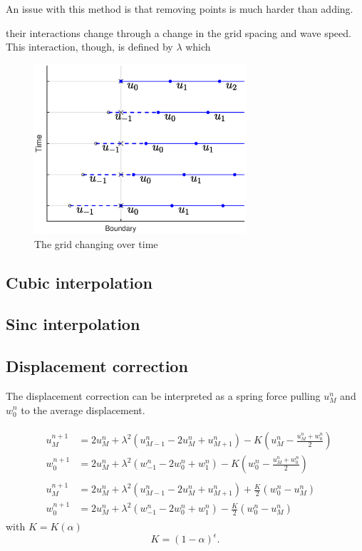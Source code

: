 An issue with this method is that removing points is much harder than adding.

their interactions change through a change in the grid spacing and wave speed. This interaction, though, is defined by $\lambda$ which 

\begin{figure}
    \centering
\includegraphics[width=0.7\textwidth]{dynamic/boundaryGrid.eps}
\caption{\label{fig:changingBoundary}{The grid changing over time}}
\end{figure}

\subsection{Cubic interpolation}

\subsection{Sinc interpolation}


\subsection{Displacement correction}

The displacement correction can be interpreted as a spring force pulling $u_M^n$ and $w_0^n$ to the average displacement.

\begin{align}
    &\begin{aligned}
        u_{M}^{n+1} &= 2u_M^n + \lambda^2 (u_{M-1} ^n- 2u_M^n  + u_{M+1}^n) - K \left(u_M^n - \frac{u_M^n + w_0^n}{2}\right)\\
        w_0^{n+1} &= 2u_M^n + \lambda^2 (w_{-1} ^n- 2w_0^n  + w_1^n) - K \left(w_0^n - \frac{u_M^n + w_0^n}{2}\right) 
    \end{aligned}\\
    &\begin{aligned}
        u_{M}^{n+1} &= 2u_M^n + \lambda^2 (u_{M-1} ^n- 2u_M^n  + u_{M+1}^n) + \frac{K}{2} (w_0^n - u_M^n)\\
        w_0^{n+1} &= 2u_M^n + \lambda^2 (w_{-1} ^n- 2w_0^n  + w_1^n) - \frac{K}{2} (w_0^n - u_M^n) 
    \end{aligned}
\end{align}
with $K = K(\alpha)$
\begin{equation}
    K = (1-\alpha)^\epsilon.
\end{equation}